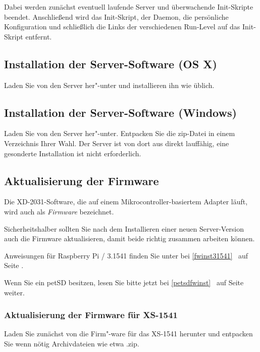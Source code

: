 \documentclass[10pt,a4paper]{scrartcl}		%
\begin{document}
Dabei werden zunächst eventuell laufende Server und überwachende Init-Skripte
beendet. Anschließend wird das Init-Skript, der Daemon, die persönliche Konfiguration
und schließlich die Links der verschiedenen Run-Level
auf das Init-Skript entfernt.

\subsection{Installation der Server-Software (OS X)}
Laden Sie von \osxbinaries{} den Server her"-unter und installieren ihn 
wie üblich.

\subsection{Installation der Server-Software (Windows)}
Laden Sie von \winbinaries{} den Server her"-unter. Entpacken Sie die
zip-Datei in einem Verzeichnis Ihrer Wahl. Der Server ist von dort aus
direkt lauffähig, eine gesonderte Installation ist nicht erforderlich.

\subsection{Aktualisierung der Firmware}
Die XD-2031-Software, die auf einem Mikrocontroller-basiertem Adapter
läuft, wird auch als \textit{Firmware} bezeichnet.

Sicherheitshalber sollten Sie nach dem Installieren einer neuen
Server-Version auch die Firmware aktualisieren, damit beide richtig
zusammen arbeiten können.

Anweisungen für Raspberry Pi / 3.1541 finden Sie unter
bei \glqq\ref{fwinst31541} \grqq\ auf Seite
\pageref{fwinst31541}.

Wenn Sie ein petSD besitzen, lesen Sie bitte jetzt bei
\glqq\ref{petsdfwinst} \grqq\ auf Seite
\pageref{petsdfwinst} weiter.

\subsubsection{Aktualisierung der Firmware für XS-1541}
Laden Sie zunächst von \fwbinaries{} die Firm"-ware für das XS-1541
herunter und entpacken Sie wenn nötig Archivdateien wie 
etwa \glqq .zip\grqq . 

\clearpage
\end{document}
